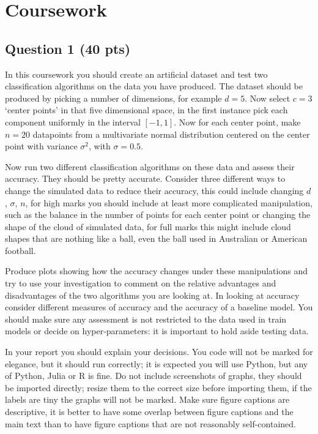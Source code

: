 \documentclass[12pt]{article}
\begin{document}
\section*{Coursework }

\subsection*{Question 1 (40 pts)}

In this coursework you should create an artificial dataset and test
two classification algorithms on the data you have produced. The
dataset should be produced by picking a number of dimensions, for
example $d=5$. Now select $c=3$ `center points' in that five
dimensional space, in the first instance pick each component uniformly
in the interval $[-1,1]$. Now for each center point, make $n=20$
datapoints from a multivariate normal distribution centered on the
center point with variance $\sigma^2$, with $\sigma=0.5$.

Now run two different classification algorithms on these data and
assess their accuracy. They should be pretty accurate. Consider three
different ways to change the simulated data to reduce their accuracy,
this could include changing $d$, $\sigma$, $n$, for high marks you
should include at least more complicated manipulation, such as the
balance in the number of points for each center point or changing the
shape of the cloud of simulated data, for full marks this might
include cloud shapes that are nothing like a ball, even the ball used
in Australian or American football.

Produce plots showing how the accuracy changes under these
manipulations and try to use your investigation to comment on the
relative advantages and disadvantages of the two algorithms you are
looking at. In looking at accuracy consider different measures of
accuracy and the accuracy of a baseline model. You should make sure
any assessment is not restricted to the data used in train models or
decide on hyper-parameters: it is important to hold aside testing
data.

In your report you should explain your decisions. You code will not be
marked for elegance, but it should run correctly; it is expected you
will use Python, but any of Python, Julia or R is fine. Do not include
screenshots of graphs, they should be imported directly; resize them
to the correct size before importing them, if the labels are tiny the
graphs will not be marked. Make sure figure captions are descriptive,
it is better to have some overlap between figure captions and the main
text than to have figure captions that are not reasonably
self-contained.
\end{document}
